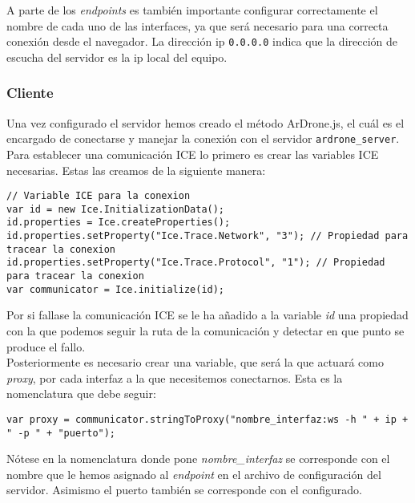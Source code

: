 A parte de los \emph{endpoints} es también importante configurar correctamente el nombre de cada uno de las interfaces, ya que será necesario para una correcta conexión desde el navegador. La dirección ip \texttt{0.0.0.0} indica que la dirección de escucha del servidor es la ip local del equipo. \\


\subsubsection{Cliente}

Una vez configurado el servidor hemos creado el método ArDrone.js, el cuál es el encargado de conectarse y manejar la conexión con el servidor \texttt{ardrone\_server}.\\

Para establecer una comunicación ICE lo primero es crear las variables ICE necesarias. Estas las creamos de la siguiente manera:\\

\begin{lstlisting}[caption=Formato \emph{endpoints} de los \emph{WebSocket} de ICEJS]
// Variable ICE para la conexion
var id = new Ice.InitializationData();
id.properties = Ice.createProperties();
id.properties.setProperty("Ice.Trace.Network", "3"); // Propiedad para tracear la conexion
id.properties.setProperty("Ice.Trace.Protocol", "1"); // Propiedad para tracear la conexion
var communicator = Ice.initialize(id);
\end{lstlisting}

Por si fallase la comunicación ICE se le ha añadido a la variable \emph{id} una propiedad con la que podemos seguir la ruta de la comunicación y detectar en que punto se produce el fallo.\\

Posteriormente es necesario crear una variable, que será la que actuará como \emph{proxy}, por cada interfaz a la que necesitemos conectarnos. Esta es la nomenclatura que debe seguir:\\

\begin{lstlisting}[caption=Nomenclatura de variable que actuará como \emph{proxy}]
var proxy = communicator.stringToProxy("nombre_interfaz:ws -h " + ip + " -p " + "puerto");
\end{lstlisting}

Nótese en la nomenclatura donde pone \emph{nombre\_interfaz} se corresponde con el nombre que le hemos asignado al \emph{endpoint} en el archivo de configuración del servidor. Asimismo el puerto también se corresponde con el configurado.\\



